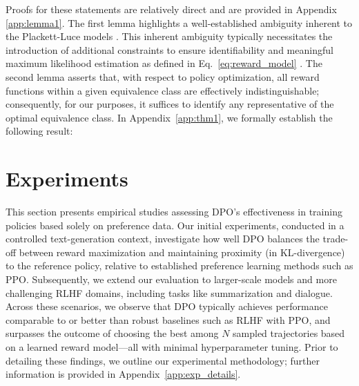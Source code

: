 Proofs for these statements are relatively direct and are provided in Appendix \ref{app:lemma1}. The first lemma highlights a well-established ambiguity inherent to the Plackett-Luce models \cite{plackett1975analysis}. This inherent ambiguity typically necessitates the introduction of additional constraints to ensure identifiability and meaningful maximum likelihood estimation as defined in Eq.~\ref{eq:reward_model} \cite{bong2022generalized}. The second lemma asserts that, with respect to policy optimization, all reward functions within a given equivalence class are effectively indistinguishable; consequently, for our purposes, it suffices to identify any representative of the optimal equivalence class. In Appendix~\ref{app:thm1}, we formally establish the following result:

\section{Experiments}
This section presents empirical studies assessing DPO’s effectiveness in training policies based solely on preference data. Our initial experiments, conducted in a controlled text-generation context, investigate how well DPO balances the trade-off between reward maximization and maintaining proximity (in KL-divergence) to the reference policy, relative to established preference learning methods such as PPO. Subsequently, we extend our evaluation to larger-scale models and more challenging RLHF domains, including tasks like summarization and dialogue. Across these scenarios, we observe that DPO typically achieves performance comparable to or better than robust baselines such as RLHF with PPO, and surpasses the outcome of choosing the best among $N$ sampled trajectories based on a learned reward model—all with minimal hyperparameter tuning. Prior to detailing these findings, we outline our experimental methodology; further information is provided in Appendix~\ref{app:exp_details}.

